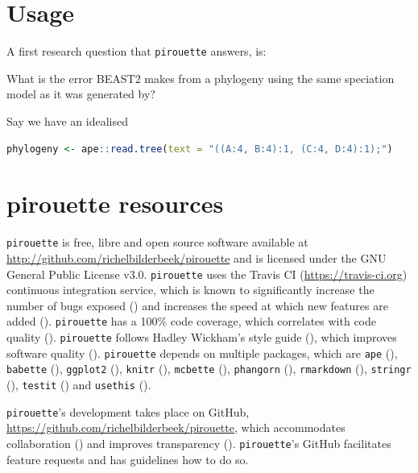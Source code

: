 \documentclass{article}
\begin{document}
\section{Usage}

A first research question that \verb;pirouette; answers, is:

What is the error BEAST2 makes from a phylogeny using the same 
speciation model as it was generated by?

Say we have an idealised

\begin{lstlisting}[language=R, floatplacement=H]
phylogeny <- ape::read.tree(text = "((A:4, B:4):1, (C:4, D:4):1);")
\end{lstlisting}



\section{pirouette resources}

\verb;pirouette; is free, libre and open source software available at 
\url{http://github.com/richelbilderbeek/pirouette}
and is licensed under the GNU General Public License v3.0.
\verb;pirouette; uses the Travis CI (\url{https://travis-ci.org})
continuous integration service, which is known to significantly 
increase the number of bugs exposed (\cite{vasilescu2015}) and increases
the speed at which new features are added (\cite{vasilescu2015}).
\verb;pirouette; has a 100\% code coverage, which correlates with 
code quality (\cite{horgan1994,del1995correlation}). 
\verb;pirouette; follows Hadley Wickham's style guide (\cite{style_guide}), 
which improves software quality (\cite{fang2001}).
\verb;pirouette; depends on multiple packages, which are 
\verb;ape; (\cite{APE}), 
\verb;babette; (\cite{bilderbeek2018babette}),
\verb;ggplot2; (\cite{ggplot2}),
\verb;knitr; (\cite{knitr}),
\verb;mcbette; (\cite{mcbette}),
\verb;phangorn; (\cite{phangorn}),
\verb;rmarkdown; (\cite{rmarkdown}),
\verb;stringr; (\cite{stringr}),
\verb;testit; (\cite{testit}) and 
\verb;usethis; (\cite{usethis}).

\verb;pirouette;'s development takes place on GitHub,
\url{https://github.com/richelbilderbeek/pirouette}, 
which accommodates collaboration (\cite{perez2016ten}) 
and improves transparency (\cite{gorgolewski2016practical}).
\verb;pirouette;'s GitHub facilitates feature requests and 
has guidelines how to do so.
\end{document}
